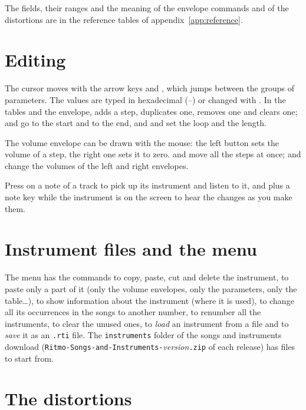 The fields, their ranges and the meaning of the envelope commands and of the distortions are in the reference tables of
appendix~\ref{app:reference}.

\section{Editing}

The cursor moves with the arrow keys and , which jumps between the groups of parameters. The values are typed in hexadecimal
(--) or changed with . In the tables and the envelope,  adds a step,
 duplicates one,  removes one and  clears one;  and  go to the start and to
the end, and  and  set the loop and the length.

The volume envelope can be drawn with the mouse: the left button sets the volume of a step, the right one sets it to zero.
 and  move all the steps at once;  and \key{-} change the volumes of the left and
right envelopes.

\begin{tip}
Press  on a note of a track to pick up its instrument and listen to it, and  plus a note key while the
instrument is on the screen to hear the changes as you make them.
\end{tip}

\section{Instrument files and the  menu}

The  menu has the commands to copy, paste, cut and delete the instrument, to paste only a part of it (only the
volume envelopes, only the parameters, only the table\ldots), to show information about the instrument (where it is used), to change all its occurrences in the songs to another number, to renumber all the instruments, to clear the unused
ones, to \emph{load} an instrument from a file and to \emph{save} it as an \texttt{.rti} file.
The \texttt{instruments} folder of the songs and instruments download (\texttt{Ritmo-Songs-and-Instruments-}\emph{version}\texttt{.zip}
of each release) has files to start from.

\section{The distortions}

